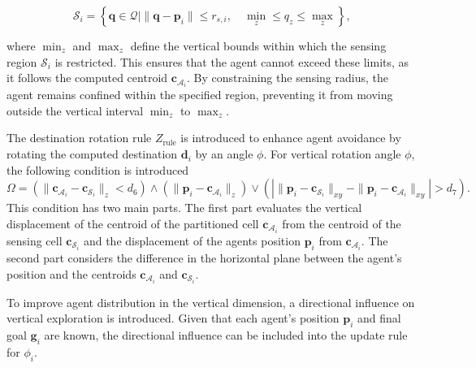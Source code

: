         \begin{equation}
            \mathcal{S}_i = \left\{\mathbf{q} \in \mathcal{Q} \mid \|\mathbf{q} - \mathbf{p}_i\| \leq r_{s,i}, \quad \min_z \leq q_z \leq \max_z \right\}\text{,}
        \end{equation}

        where $\min_z$ and $\max_z$ define the vertical bounds within which the sensing region $\mathcal{S}_i$ is restricted. 
        This ensures that the agent cannot exceed these limits, as it follows the computed centroid \( \mathbf{c}_{\mathcal{A}_i} \). 
        By constraining the sensing radius, the agent remains confined within the specified region, preventing it from moving outside the vertical interval $\min_z$ to $\max_z$.

        The destination rotation rule $Z_{\text{rule}}$ is introduced to enhance agent avoidance by rotating the computed destination $\mathbf{d}_i$ by an angle $\phi$.
        For vertical rotation angle $\phi$, the following condition is introduced
        \begin{equation}
            \label{eqn:phi_condition}
            \Omega = (\|\mathbf{c}_{\mathcal{A}_i} - \mathbf{c}_{\mathcal{S}_i}\|_z < d_6) \land (\|\mathbf{p}_i - \mathbf{c}_{\mathcal{A}_i}\|_z) \lor 
            (| \|\mathbf{p}_i - \mathbf{c}_{\mathcal{S}_i}\|_{xy} - \|\mathbf{p}_i - \mathbf{c}_{\mathcal{A}_i}\|_{xy} | > d_7 ) \text{.}
        \end{equation}
        This condition has two main parts. The first part evaluates the vertical displacement of the centroid of the partitioned cell $\mathbf{c}_{\mathcal{A}_i}$ from the centroid of the sensing cell $\mathbf{c}_{\mathcal{S}_i}$ and the
        displacement of the agents position $\mathbf{p}_i$ from $\mathbf{c}_{\mathcal{A}_i}$.
        The second part considers the difference in the horizontal plane between the agent's position and the centroids $\mathbf{c}_{\mathcal{A}_i}$ and $\mathbf{c}_{\mathcal{S}_i}$.

        To improve agent distribution in the vertical dimension, a directional influence on vertical exploration is introduced. 
        Given that each agent's position $\mathbf{p}_i$ and final goal $\mathbf{g}_i$ are known, the directional influence can be included into the update rule for $\phi_i$.

